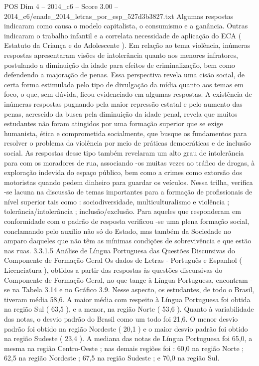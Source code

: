 \begin{textsample}{POS Dim 4 – 2014\_c6 – Score 3.00 – 2014\_c6/enade\_2014\_letras\_por\_esp\_527d3b3827.txt}
Algumas respostas indicaram como causa o modelo capitalista, o consumismo e a ganância.
Outras indicaram o trabalho infantil e a correlata necessidade de aplicação do ECA ( Estatuto da Criança e do Adolescente ).
Em relação ao tema violência, inúmeras respostas apresentaram visões de intolerância quanto aos menores infratores, postulando a diminuição da idade para efeitos de criminalização, bem como defendendo a majoração de penas.
Essa perspectiva revela uma cisão social, de certa forma estimulada pelo tipo de divulgação da mídia quanto aos temas em foco, o que, sem dúvida, ficou evidenciado em algumas respostas.
A existência de inúmeras respostas pugnando pela maior repressão estatal e pelo aumento das penas, acrescido da busca pela diminuição da idade penal, revela que muitos estudantes não foram atingidos por uma formação superior que se exige humanista, ética e comprometida socialmente, que busque os fundamentos para resolver o problema da violência por meio de práticas democráticas e de inclusão social.
As respostas desse tipo também revelaram um alto grau de intolerância para com os moradores de rua, associando -os muitas vezes ao tráfico de drogas, à exploração indevida do espaço público, bem como a crimes como extorsão dos motoristas quando pedem dinheiro para guardar os veículos.
Nessa trilha, verifica -se lacuna na discussão de temas importantes para a formação de profissionais de nível superior tais como : sociodiversidade, multiculturalismo e violência ; tolerância/intolerância ; inclusão/exclusão.
Para aqueles que responderam em conformidade com o padrão de resposta verificou -se uma plena formação social, conclamando pelo auxílio não só do Estado, mas também da Sociedade no amparo daqueles que não têm as mínimas condições de sobrevivência e que estão nas ruas. 3.3.1.5 Análise de Língua Portuguesa das Questões Discursivas do Componente de Formação Geral Os dados de Letras - Português e Espanhol ( Licenciatura ), obtidos a partir das respostas às questões discursivas do Componente de Formação Geral, no que tange à Língua Portuguesa, encontram -se na Tabela 3.14 e no Gráfico 3.9.
Nesse aspecto, os estudantes, de todo o Brasil, tiveram média 58,6.
A maior média com respeito à Língua Portuguesa foi obtida na região Sul ( 63,5 ), e a menor, na região Norte ( 53,6 ).
Quanto à variabilidade das notas, o desvio padrão do Brasil como um todo foi 21,6.
O menor desvio padrão foi obtido na região Nordeste ( 20,1 ) e o maior desvio padrão foi obtido na região Sudeste ( 23,4 ).
A mediana das notas de Língua Portuguesa foi 65,0, a mesma na região Centro-Oeste ; nas demais regiões foi : 60,0 na região Norte ; 62,5 na região Nordeste ; 67,5 na região Sudeste ; e 70,0 na região Sul.

\end{textsample}

